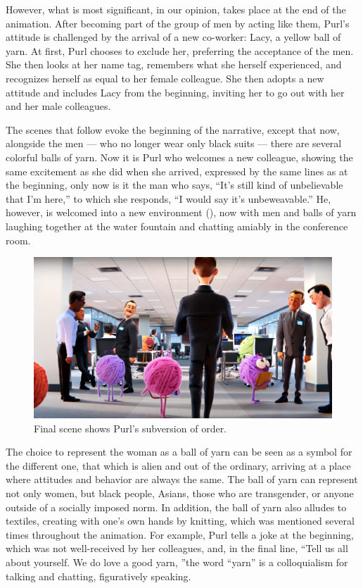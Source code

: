 \documentclass[english]{textolivre}
\begin{document}
However, what is most significant, in our opinion, takes place at the end of the animation. After becoming part of the group of men by acting like them, Purl’s attitude is challenged by the arrival of a new co-worker: Lacy, a yellow ball of yarn. At first, Purl chooses to exclude her, preferring the acceptance of the men. She then looks at her name tag, remembers what she herself experienced, and recognizes herself as equal to her female colleague. She then adopts a new attitude and includes Lacy from the beginning, inviting her to go out with her and her male colleagues.

The scenes that follow evoke the beginning of the narrative, except that now, alongside the men — who no longer wear only black suits — there are several colorful balls of yarn. Now it is Purl who welcomes a new colleague, showing the same excitement as she did when she arrived, expressed by the same lines as at the beginning, only now is it the man who says, “It’s still kind of unbelievable that I’m here,” to which she responds, “I would say it’s unbeweavable.” He, however, is welcomed into a new environment (), now with men and balls of yarn laughing together at the water fountain and chatting amiably in the conference room.

\begin{figure}[htbp]
\centering
\begin{minipage}{.7\textwidth}
 \includegraphics[width=\textwidth]{Fig8.png}
 \caption{Final scene shows Purl’s subversion of order.}
 \label{fig8}
\end{minipage}
\end{figure}

The choice to represent the woman as a ball of yarn can be seen as a symbol for the different one, that which is alien and out of the ordinary, arriving at a place where attitudes and behavior are always the same. The ball of yarn can represent not only women, but black people, Asians, those who are transgender, or anyone outside of a socially imposed norm. In addition, the ball of yarn also alludes to textiles, creating with one’s own hands by knitting, which was mentioned several times throughout the animation. For example, Purl tells a joke at the beginning, which was not well-received by her colleagues, and, in the final line, “Tell us all about yourself. We do love a good yarn, ”the word “yarn” is a colloquialism for talking and chatting, figuratively speaking. 
\end{document}
